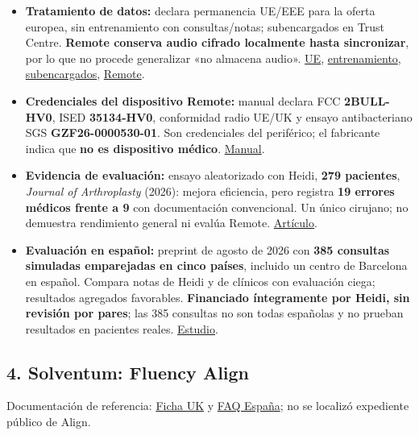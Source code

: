 \begin{itemize}
\item \textbf{Tratamiento de datos:} declara permanencia UE/\allowbreak{}EEE para la oferta europea, sin entrenamiento con consultas/\allowbreak{}notas; subencargados en Trust Centre. \textbf{Remote conserva audio cifrado localmente hasta sincronizar}, por lo que no procede generalizar «no almacena audio». \href{https://www.heidihealth.com/compliance/gdpr}{UE}, \href{https://support.heidihealth.com/en/articles/14648423-how-heidi-protects-your-data}{entrenamiento}, \href{https://trust.heidihealth.com/subprocessors}{subencargados}, \href{https://support.heidihealth.com/en/articles/14130260-getting-started-with-heidi-remote}{Remote}.
\item \textbf{Credenciales del dispositivo Remote:} manual declara FCC \textbf{2BULL-HV0}, ISED \textbf{35134-HV0}, conformidad radio UE/\allowbreak{}UK y ensayo antibacteriano SGS \textbf{GZF26-0000530-01}. Son credenciales del periférico; el fabricante indica que \textbf{no es dispositivo médico}. \href{https://www.heidihealth.com/en-ca/docs/remote-user-manual}{Manual}.
\item \textbf{Evidencia de evaluación:} ensayo aleatorizado con Heidi, \textbf{279 pacientes}, \emph{Journal of Arthroplasty} (2026): mejora eficiencia, pero registra \textbf{19 errores médicos frente a 9} con documentación convencional. Un único cirujano; no demuestra rendimiento general ni evalúa Remote. \href{https://doi.org/10.1016/j.arth.2026.03.069}{Artículo}.
\item \textbf{Evaluación en español:} preprint de agosto de 2026 con \textbf{385 consultas simuladas emparejadas en cinco países}, incluido un centro de Barcelona en español. Compara notas de Heidi y de clínicos con evaluación ciega; resultados agregados favorables. \textbf{Financiado íntegramente por Heidi, sin revisión por pares}; las 385 consultas no son todas españolas y no prueban resultados en pacientes reales. \href{https://www.medrxiv.org/content/10.64898/2026.08.18.26360701v1}{Estudio}.
\end{itemize}

\subsection*{4. Solventum: Fluency Align}
\label{provider:4}

Documentación de referencia: \href{https://assets.solventum.com/is/content/mmmspinco/fluency-align-key-benefits-and-security-data-sheet-his-cps-en-gbpdf}{Ficha UK} y \href{https://www.solventum.com/es-es/home/health-information-technology/solutions/fluency-align/}{FAQ España}; no se localizó expediente público de Align.

